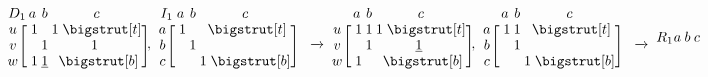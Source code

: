 \documentclass[sn-mathphys]{sn-jnl}
\begin{document}
$$
	\def\rowsp{0.4em}
	\def\arraystretch{0.95}
	\makeatletter\setlength\BA@colsep{1.2pt}\makeatother
	\begin{blockarray}{cccc}{D_1}
	 \kern-0.2em & a & b & c  \\
		\begin{block}{c[ccc]}
  		u \kern\rowsp  & \; 1 &    &  1 \; \topstrut \\
  		v \kern\rowsp & \;     &  1 & 1 \; \\
  		w \kern\rowsp & \; 1 &  \underline{1} &    \; \botstrut \\
		\end{block}
	\end{blockarray}
	\; , \;
	\begin{blockarray}{cccc}{I_1}
	\kern-0.2em & a & b & c  \\
		\begin{block}{c[ccc]}
        a \kern\rowsp  & \; 1 &  &  \; \topstrut \\
  		b \kern\rowsp & \;  & 1 & \; \\
  		c \kern\rowsp & \;  &  & 1 \; \botstrut \\
		\end{block}
	\end{blockarray}
	\quad \xrightarrow{} \,
	\begin{blockarray}{cccc}{}
	\kern-0.2em & a & b & c  \\
		\begin{block}{c[ccc]}
  		u \kern\rowsp  & \; 1 & 1 & 1 \; \topstrut \\
  		v \kern\rowsp & \;     & 1 & \underline{1} \; \\
  		w \kern\rowsp & \; 1 &    &    \; \botstrut \\
		\end{block}
	\end{blockarray}
	\; , \;
	\begin{blockarray}{cccc}{}
	\kern-0.2em & a & b & c  \\
		\begin{block}{c[ccc]}
  		a \kern\rowsp  & \; 1 & 1 &    \; \topstrut \\
  		b \kern\rowsp & \;     & 1 &    \; \\
  		c \kern\rowsp & \;     &    & 1 \; \botstrut \\
		\end{block}
	\end{blockarray}
	\quad \xrightarrow{} \,
	\begin{blockarray}{cccc}{R_1}
	\kern-0.2em & a & b & c  \\

\end{blockarray}$$
\end{document}
